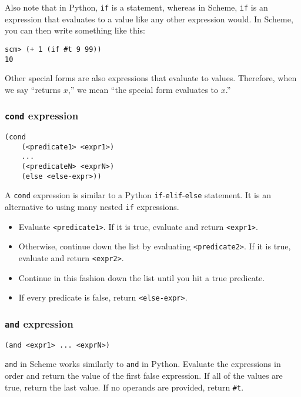 Also note that in Python, \lstinline{if} is a statement, whereas in Scheme, \lstinline{if} is an expression that evaluates to a value like any other expression would. In Scheme, you can then write something like this:
\begin{lstlisting}
scm> (+ 1 (if #t 9 99))
10
\end{lstlisting}

Other special forms are also expressions that evaluate to values. 
Therefore, when we say ``returns $x$,'' we mean ``the special form evaluates to $x$.''

\subsubsection{\lstinline{cond} expression}

\begin{lstlisting}
(cond 
    (<predicate1> <expr1>) 
    ... 
    (<predicateN> <exprN>) 
    (else <else-expr>))
\end{lstlisting}

A \lstinline{cond} expression is similar to a Python \lstinline{if}-\lstinline{elif}-\lstinline{else} statement. It is an alternative to using many nested \lstinline{if} expressions. 

\begin{itemize}
    \item Evaluate \lstinline{<predicate1>}. If it is true, evaluate and return \lstinline{<expr1>}.
    \item Otherwise, continue down the list by evaluating \lstinline{<predicate2>}. If it is true, evaluate and return \lstinline{<expr2>}.
    \item Continue in this fashion down the list until you hit a true predicate.
    \item If every predicate is false, return \lstinline{<else-expr>}. 
\end{itemize}

\subsubsection{\lstinline{and} expression}
\begin{lstlisting}
(and <expr1> ... <exprN>)
\end{lstlisting}
\lstinline{and} in Scheme works similarly to \lstinline{and} in Python. Evaluate the expressions in order and return the value of the first false expression. If all of the values are true, return the last value. If no operands are provided, return \lstinline{#t}.

